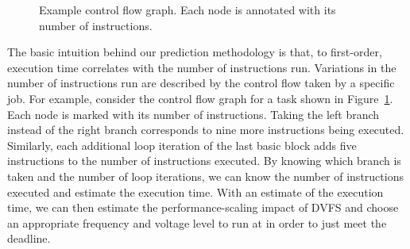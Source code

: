 \begin{figure}
\begin{center}
    \caption{Example control flow graph. Each node is annotated with its number
    of instructions.}
    \label{fig:exec_time_prediction.prediction.cfg}
  \end{center}
\end{figure}

The basic intuition behind our prediction methodology is that, to first-order,
execution time correlates with the number of instructions run. Variations in
the number of instructions run are described by the control flow taken by a
specific job. For example, consider the control flow graph for a task shown in
Figure~\ref{fig:exec_time_prediction.prediction.cfg}. Each node is marked with
its number of instructions.  Taking the left branch instead of the right branch
corresponds to nine more instructions being executed. Similarly, each
additional loop iteration of the last basic block adds five instructions to the
number of instructions executed. By knowing which branch is taken and the
number of loop iterations, we can know the number of instructions executed and
estimate the execution time.  With an estimate of the execution time, we can
then estimate the performance-scaling impact of DVFS and choose an appropriate
frequency and voltage level to run at in order to just meet the deadline.

